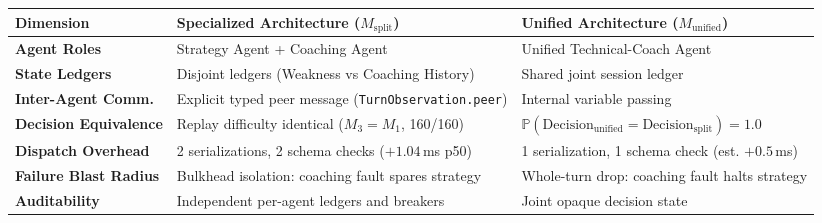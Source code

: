 \begin{tabular}{lp{4.2cm}p{4.2cm}}
\toprule
\textbf{Dimension} & \textbf{Specialized Architecture ($M_{\text{split}}$)} & \textbf{Unified Architecture ($M_{\text{unified}}$)} \\
\midrule
\textbf{Agent Roles} & Strategy Agent + Coaching Agent & Unified Technical-Coach Agent \\
\textbf{State Ledgers} & Disjoint ledgers (Weakness vs Coaching History) & Shared joint session ledger \\
\textbf{Inter-Agent Comm.} & Explicit typed peer message (\texttt{TurnObservation.peer}) & Internal variable passing \\
\textbf{Decision Equivalence} & Replay difficulty identical ($M_3 = M_1$, 160/160) & $\mathbb{P}(\text{Decision}_{\text{unified}} = \text{Decision}_{\text{split}}) = 1.0$ \\
\textbf{Dispatch Overhead} & 2 serializations, 2 schema checks ($+1.04$\,ms p50) & 1 serialization, 1 schema check (est. $+0.5$\,ms) \\
\textbf{Failure Blast Radius} & Bulkhead isolation: coaching fault spares strategy & Whole-turn drop: coaching fault halts strategy \\
\textbf{Auditability} & Independent per-agent ledgers and breakers & Joint opaque decision state \\
\bottomrule
\end{tabular}
